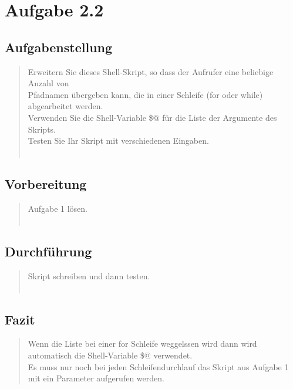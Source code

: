 \section{Aufgabe 2.2}
	\subsection{Aufgabenstellung}
		\begin{quote}
			Erweitern Sie dieses Shell-Skript, so dass der Aufrufer eine beliebige Anzahl von\\
			Pfadnamen \"ubergeben kann, die in einer Schleife (for oder while) abgearbeitet werden.\\
			Verwenden Sie die Shell-Variable \$@ f\"ur die Liste der Argumente des Skripts.\\
			Testen Sie Ihr Skript mit verschiedenen Eingaben.\\ \\
		\end{quote}
	\subsection{Vorbereitung}
		\begin{quote}
			Aufgabe 1 l\"osen.\\ \\
		\end{quote}
	\subsection{Durchführung}
		\begin{quote}
			Skript schreiben und dann testen.\\ \\
		\end{quote}
	\subsection{Fazit}
		\begin{quote}
			Wenn die Liste bei einer for Schleife weggelssen wird dann wird automatisch die Shell-Variable \$@ verwendet.\\
			Es muss nur noch bei jeden Schleifendurchlauf das Skript aus Aufgabe 1 mit ein Parameter aufgerufen werden.\\
		\end{quote}